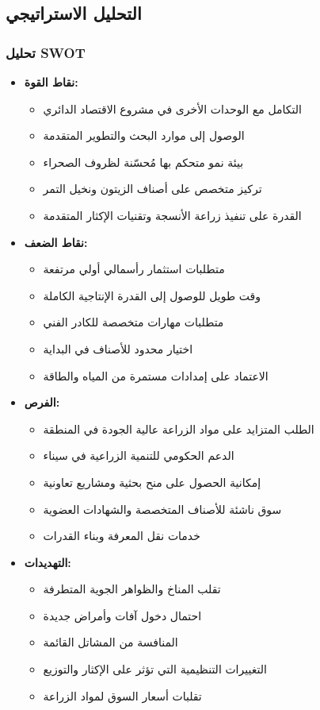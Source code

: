 \subsection{التحليل الاستراتيجي}

\subsubsection{تحليل SWOT}
\begin{itemize}
    \item \textbf{نقاط القوة:}
    \begin{itemize}
        \item التكامل مع الوحدات الأخرى في مشروع الاقتصاد الدائري
        \item الوصول إلى موارد البحث والتطوير المتقدمة
        \item بيئة نمو متحكم بها مُحسّنة لظروف الصحراء
        \item تركيز متخصص على أصناف الزيتون ونخيل التمر
        \item القدرة على تنفيذ زراعة الأنسجة وتقنيات الإكثار المتقدمة
    \end{itemize}
    
    \item \textbf{نقاط الضعف:}
    \begin{itemize}
        \item متطلبات استثمار رأسمالي أولي مرتفعة
        \item وقت طويل للوصول إلى القدرة الإنتاجية الكاملة
        \item متطلبات مهارات متخصصة للكادر الفني
        \item اختيار محدود للأصناف في البداية
        \item الاعتماد على إمدادات مستمرة من المياه والطاقة
    \end{itemize}
    
    \item \textbf{الفرص:}
    \begin{itemize}
        \item الطلب المتزايد على مواد الزراعة عالية الجودة في المنطقة
        \item الدعم الحكومي للتنمية الزراعية في سيناء
        \item إمكانية الحصول على منح بحثية ومشاريع تعاونية
        \item سوق ناشئة للأصناف المتخصصة والشهادات العضوية
        \item خدمات نقل المعرفة وبناء القدرات
    \end{itemize}
    
    \item \textbf{التهديدات:}
    \begin{itemize}
        \item تقلب المناخ والظواهر الجوية المتطرفة
        \item احتمال دخول آفات وأمراض جديدة
        \item المنافسة من المشاتل القائمة
        \item التغييرات التنظيمية التي تؤثر على الإكثار والتوزيع
        \item تقلبات أسعار السوق لمواد الزراعة
    \end{itemize}
\end{itemize}

